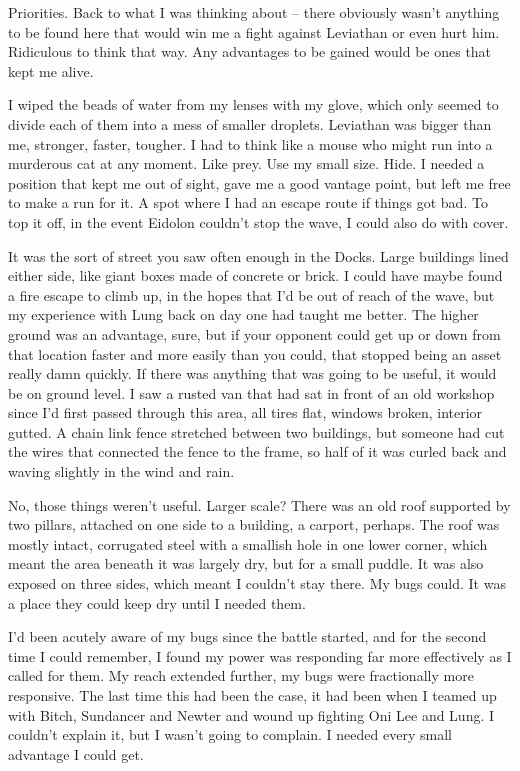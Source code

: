 Priorities.  Back to what I was thinking about – there obviously wasn't anything to be found here that would win me a fight against Leviathan or even hurt him.  Ridiculous to think that way.  Any advantages to be gained would be ones that kept me alive.



I wiped the beads of water from my lenses with my glove, which only seemed to divide each of them into a mess of smaller droplets.  Leviathan was bigger than me, stronger, faster, tougher.  I had to think like a mouse who might run into a murderous cat at any moment.  Like prey.  Use my small size.  Hide.  I needed a position that kept me out of sight, gave me a good vantage point, but left me free to make a run for it.  A spot where I had an escape route if things got bad.  To top it off, in the event Eidolon couldn't stop the wave, I could also do with cover.



It was the sort of street you saw often enough in the Docks.  Large buildings lined either side, like giant boxes made of concrete or brick.  I could have maybe found a fire escape to climb up, in the hopes that I'd be out of reach of the wave, but my experience with Lung back on day one had taught me better.  The higher ground was an advantage, sure, but if your opponent could get up or down from that location faster and more easily than you could, that stopped being an asset really damn quickly.  If there was anything that was going to be useful, it would be on ground level.  I saw a rusted van that had sat in front of an old workshop since I'd first passed through this area, all tires flat, windows broken, interior gutted.  A chain link fence stretched between two buildings, but someone had cut the wires that connected the fence to the frame, so half of it was curled back and waving slightly in the wind and rain.



No, those things weren't useful.  Larger scale?  There was an old roof supported by two pillars, attached on one side to a building, a carport, perhaps.  The roof was mostly intact, corrugated steel with a smallish hole in one lower corner, which meant the area beneath it was largely dry, but for a small puddle.  It was also exposed on three sides, which meant I couldn't stay there.  My bugs could.  It was a place they could keep dry until I needed them.



I'd been acutely aware of my bugs since the battle started, and for the second time I could remember, I found my power was responding far more effectively as I called for them.  My reach extended further, my bugs were fractionally more responsive.  The last time this had been the case, it had been when I teamed up with Bitch, Sundancer and Newter and wound up fighting Oni Lee and Lung.  I couldn't explain it, but I wasn't going to complain.  I needed every small advantage I could get.



